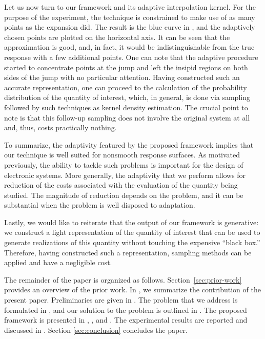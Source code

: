 Let us now turn to our framework and its adaptive interpolation kernel. For the
purpose of the experiment, the technique is constrained to make use of as many
points as the  expansion did. The result is the blue curve in
, and the adaptively chosen points are plotted on the
horizontal axis. It can be seen that the approximation is good, and, in fact, it
would be indistinguishable from the true response with a few additional points.
One can note that the adaptive procedure started to concentrate points at the
jump and left the insipid regions on both sides of the jump with no particular
attention. Having constructed such an accurate representation, one can proceed
to the calculation of the probability distribution of the quantity of interest,
which, in general, is done via sampling followed by such techniques as kernel
density estimation. The crucial point to note is that this follow-up sampling
does not involve the original system at all and, thus, costs practically
nothing.

To summarize, the adaptivity featured by the proposed framework implies that our
technique is well suited for nonsmooth response surfaces. As motivated
previously, the ability to tackle such problems is important for the design of
electronic systems. More generally, the adaptivity that we perform allows for
reduction of the costs associated with the evaluation of the quantity being
studied. The magnitude of reduction depends on the problem, and it can be
substantial when the problem is well disposed to adaptation.

Lastly, we would like to reiterate that the output of our framework is
generative: we construct a light representation of the quantity of interest that
can be used to generate realizations of this quantity without touching the
expensive ``black box.'' Therefore, having constructed such a representation,
sampling methods can be applied and have a negligible cost.

The remainder of the paper is organized as follows. Section~\ref{sec:prior-work}
provides an overview of the prior work. In , we summarize the
contribution of the present paper. Preliminaries are given in
. The problem that we address is formulated in
, and our solution to the problem is outlined in
. The proposed framework is presented in ,
, and . The experimental results are reported
and discussed in . Section \ref{sec:conclusion}
concludes the paper.
